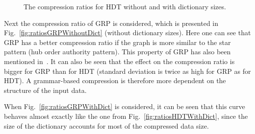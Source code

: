 \begin{figure}[h]
	\centering
	\hfill
	\caption{The compression ratios for HDT without and with dictionary sizes.}
\end{figure}

Next the compression ratio of GRP is considered, which is presented in Fig.~\ref{fig:ratiosGRPWithoutDict} (without dictionary sizes). Here one can see that GRP has a better compression ratio if the graph is more similar to the star pattern (hub order authority pattern). This property of GRP has also been mentioned in~\cite{maneth}. It can also be seen that the effect on the compression ratio is bigger for GRP than for HDT (standard deviation is twice as high for GRP as for HDT). A grammar-based compression is therefore more dependent on the structure of the input data.

When Fig.~\ref{fig:ratiosGRPWithDict} is considered, it can be seen that this curve behaves almost exactly like the one from Fig.~\ref{fig:ratiosHDTWithDict}, since the size of the dictionary accounts for most of the compressed data size.

